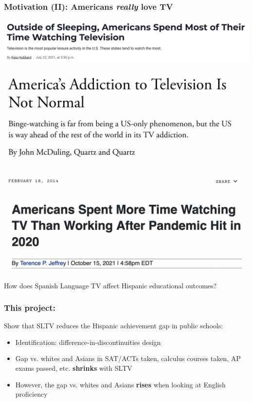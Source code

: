 \documentclass{beamer}
\begin{document}
\begin{frame}
\frametitle{Motivation (II): Americans \textit{really} love TV}
\vspace{1.5pt}
\centering
        \includegraphics[width=\textwidth]{figs/tv_time1}
        \vspace{-3em}
\begin{flushright}
                \includegraphics[width=.8\textwidth]{figs/tv_time4}
\end{flushright}
\vspace{-4em}
        \includegraphics[width=\textwidth]{figs/tv_time2}\\
\end{frame}



\begin{frame}



\huge {\color{darkblue} How does Spanish Language TV affect Hispanic educational outcomes?}

\end{frame}


\begin{frame}
\frametitle{This project:}

Show that SLTV reduces the Hispanic achievement gap in public schools:
\vspace{1.5em}
\begin{itemize}
  \setlength\itemsep{1.5em}

\item Identification: difference-in-discontinuities design
\item Gap vs. whites and Asians in SAT/ACTs taken, calculus courses taken, AP exams passed, etc. \textbf{shrinks} with SLTV
\item However, the gap vs. whites and Asians \textbf{rises} when looking at English proficiency
\end{itemize}

\end{frame}
\end{document}
